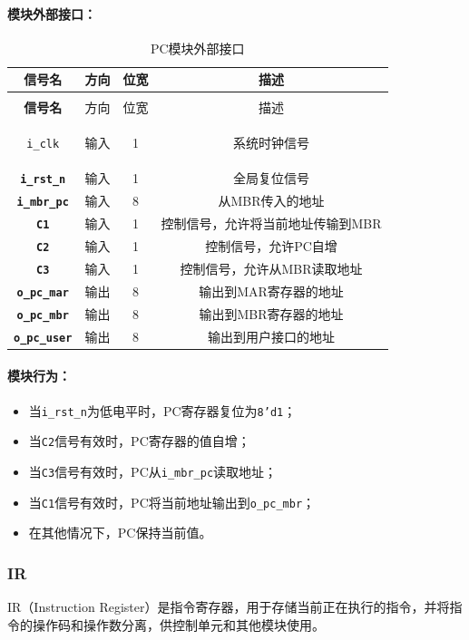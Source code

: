 \documentclass[lang=cn,a4paper,newtx]{elegantpaper}
\begin{document}
\paragraph{模块外部接口：}
\begin{longtable}{>{\bfseries}c c c c}
  \caption{PC模块外部接口} \\ 
  \toprule
  信号名 & 方向 & 位宽 & 描述 \\ 
  \midrule
  \endfirsthead

  \multicolumn{4}{l}{\textbf{（续表）PC模块外部接口}} \\ 
  \toprule
  信号名 & 方向 & 位宽 & 描述 \\ 
  \midrule
  \endhead

  \texttt{i\_clk} & 输入 & 1 & 系统时钟信号 \\ 
  \texttt{i\_rst\_n} & 输入 & 1 & 全局复位信号 \\ 
  \texttt{i\_mbr\_pc} & 输入 & 8 & 从MBR传入的地址 \\ 
  \texttt{C1} & 输入 & 1 & 控制信号，允许将当前地址传输到MBR \\ 
  \texttt{C2} & 输入 & 1 & 控制信号，允许PC自增 \\ 
  \texttt{C3} & 输入 & 1 & 控制信号，允许从MBR读取地址 \\ 
  \texttt{o\_pc\_mar} & 输出 & 8 & 输出到MAR寄存器的地址 \\ 
  \texttt{o\_pc\_mbr} & 输出 & 8 & 输出到MBR寄存器的地址 \\ 
  \texttt{o\_pc\_user} & 输出 & 8 & 输出到用户接口的地址 \\ 
  \bottomrule
\end{longtable}

\paragraph{模块行为：}
\begin{itemize}
  \item 当\texttt{i\_rst\_n}为低电平时，PC寄存器复位为\texttt{8'd1}；
  \item 当\texttt{C2}信号有效时，PC寄存器的值自增；
  \item 当\texttt{C3}信号有效时，PC从\texttt{i\_mbr\_pc}读取地址；
  \item 当\texttt{C1}信号有效时，PC将当前地址输出到\texttt{o\_pc\_mbr}；
  \item 在其他情况下，PC保持当前值。
\end{itemize}
\subsubsection{IR}
IR（Instruction Register）是指令寄存器，用于存储当前正在执行的指令，并将指令的操作码和操作数分离，供控制单元和其他模块使用。
\end{document}
